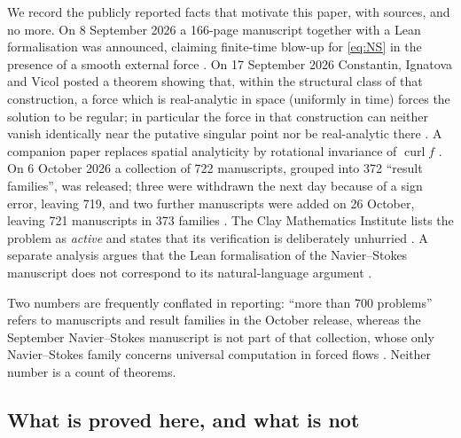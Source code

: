 \documentclass[11pt]{article}
\theoremstyle{remark}
\newcommand{\curl}{\operatorname{curl}}
\begin{document}
We record the publicly reported facts that motivate this paper, with sources, and no more.
On 8 September 2026 a 166-page manuscript together with a Lean formalisation was announced,
claiming finite-time blow-up for \eqref{eq:NS} in the presence of a smooth external force
\cite{OpenAI2026,WikipediaNS}. On 17 September 2026 Constantin, Ignatova and Vicol posted a
theorem showing that, within the structural class of that construction, a force which is
real-analytic in space (uniformly in time) forces the solution to be regular; in particular
the force in that construction can neither vanish identically near the putative singular
point nor be real-analytic there \cite{CIV2026}. A companion paper replaces spatial
analyticity by rotational invariance of $\curl f$ \cite{IKX2026}. On 6 October 2026 a
collection of 722 manuscripts, grouped into 372 ``result families'', was released; three were
withdrawn the next day because of a sign error, leaving 719, and two further manuscripts were
added on 26 October, leaving 721 manuscripts in 373 families
\cite{OpenAIrepo2026,RW2026}. The Clay Mathematics Institute lists the problem as
\emph{active} and states that its verification is deliberately unhurried \cite{ClayNS}. A
separate analysis argues that the Lean formalisation of the Navier--Stokes manuscript does
not correspond to its natural-language argument \cite{BCH2026}.

Two numbers are frequently conflated in reporting: ``more than 700 problems'' refers to
manuscripts and result families in the October release, whereas the September
Navier--Stokes manuscript is not part of that collection, whose only Navier--Stokes family
concerns universal computation in forced flows \cite{OpenAIrepo2026}. Neither number is a
count of theorems.

\subsection{What is proved here, and what is not}
\end{document}
